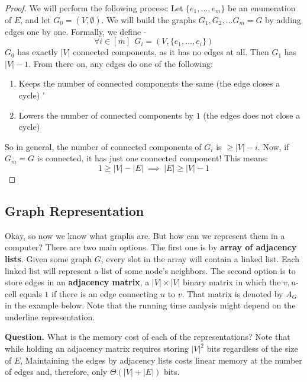 \begin{proof}
We will perform the following process: Let $\{e_1,...,e_m\}$ be an enumeration of $E$, and let $G_0=(V,\emptyset)$. We will build the graphs $G_1, G_2,... G_m=G$ by adding edges one by one. Formally, we define - 
$$\forall i\in[m]\ \ G_i=(V,\{e_1,...,e_i\})$$
$G_0$ has exactly $|V|$ connected components, as it has no edges at all. Then $G_1$ has $|V|-1$. From there on, any edges do one of the following:
\begin{enumerate}
    \item Keeps the number of connected components the same (the edge closes a cycle)
    '\item Lowers the number of connected components by $1$ (the edges does not close a cycle)
\end{enumerate}

So in general, the number of connected components of $G_i$ is $\geq |V|-i$. 
Now, if $G_m=G$ is connected, it has just one connected component! This means:
$$1 \geq |V| - |E|\ \implies \ |E|\geq|V|-1$$

\end{proof}


\subsection{Graph Representation}

Okay, so now we know what graphs are. But how can we represent them in a computer? There are two main options. The first one is by \textbf{array of adjacency lists}. Given some graph $G$, every slot in the array will contain a linked list. Each linked list will represent a list of some node's neighbors. The second option is to store edges in an \textbf{adjacency matrix}, a $ |V| \times |V| $ binary matrix in which the $v,u$-cell equals $1$ if there is an edge connecting $u$ to $v$. That matrix is denoted by $A_{G}$ in the example below. Note that the running time analysis might depend on the underline representation.     

\textbf{Question.} What is the memory cost of each of the representations? Note that while holding an adjacency matrix requires storing $|V|^2$ bits regardless of the size of $E$, Maintaining the edges by adjacency lists costs linear memory at the number of edges and, therefore, only $ \Theta \left(  |V| + |E| \right) $ bits. 


